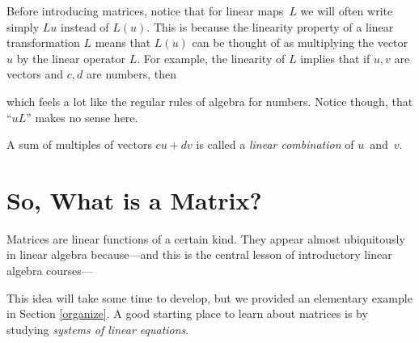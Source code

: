 Before introducing matrices, notice that for linear maps~$L$ we will often write simply $L u$ instead of $L(u)$. This is because the linearity
property of a linear transformation $L$ means that $L(u)$ can be thought of as multiplying the vector $u$ by the linear operator $L$.
For example, the linearity of $L$ implies that if $u,v$ are vectors and $c,d$ are numbers, then
\begin{center}
\shabox{\scalebox{1.1}{
$
L(c u + d v) = c L u + d L v\, ,
$}}
\end{center}
which feels a lot like the regular rules of algebra for numbers. Notice though, that ``$u L$'' makes no sense here.

\begin{remark}
A sum of multiples of vectors $c u + dv$ is called a {\itshape linear combination} of $u$~and~$v$.
\end{remark}

\section{So, What is a Matrix?}
Matrices are linear functions of a certain kind. 
They appear almost ubiquitously in linear algebra because---and this is the central lesson of introductory linear algebra courses---
\begin{center}
\end{center}
This idea will take some time to develop, but we provided an elementary example in 
Section \ref{organize}. A good starting place to  learn about matrices is by studying {\itshape systems of  linear equations}. 

